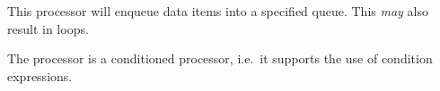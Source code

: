 
This processor will enqueue data items into a specified queue. This
\emph{may} also result in loops.

The processor is a conditioned processor, i.e.~it supports the use of
condition expressions.

